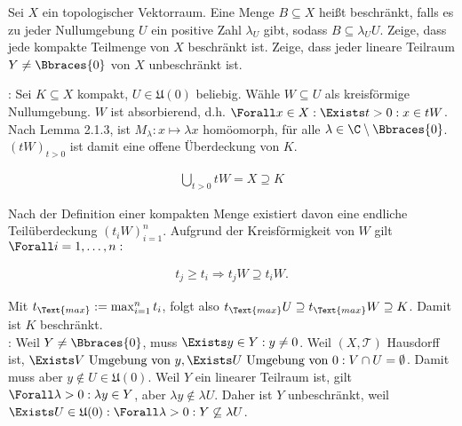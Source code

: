 \begin{exercise}

Sei $X$ ein topologischer Vektorraum.
Eine Menge $B \subseteq X$ heißt beschränkt, falls es zu jeder Nullumgebung $U$ ein positive Zahl $\lambda_U$ gibt, sodass $B \subseteq \lambda_U U$.
Zeige, dass jede kompakte Teilmenge von $X$ beschränkt ist. Zeige, dass jeder lineare Teilraum $Y \neq \Bbraces{0}$ von $X$ unbeschränkt ist.

\end{exercise}

\begin{solution}

:
Sei $K \subseteq X$ kompakt, $U \in \mathfrak{U}(0)$ beliebig.
Wähle $W \subseteq U$ als kreisförmige Nullumgebung.
$W$ ist absorbierend, d.h. $\Forall x \in X: \Exists t > 0: x \in tW$.
Nach Lemma 2.1.3, ist $M_\lambda: x \mapsto \lambda x$ homöomorph, für alle $ \lambda \in \C \setminus \Bbraces{0}$.
$(tW)_{t > 0}$ ist damit eine offene Überdeckung von $K$.

\begin{align*}
  \bigcup_{t > 0} tW = X \supseteq K
\end{align*}

Nach der Definition einer kompakten Menge existiert davon eine endliche Teilüberdeckung $(t_i W)_{i=1}^n$.
Aufgrund der Kreisförmigkeit von $W$ gilt $\Forall i = 1, \ldots, n:$

\begin{align*}
  t_j \geq t_i
  \Rightarrow
  t_j W \supseteq t_i W.
\end{align*}

Mit $t_\Text{max} := \max_{i=1}^n t_i$, folgt also $t_\Text{max} U \supseteq t_\Text{max} W \supseteq K$.
Damit ist $K$ beschränkt. \\

:
Weil $Y \neq \Bbraces{0}$, muss $\Exists y \in Y: y \neq 0$. Weil $(X, \mathcal{T})$ Hausdorff ist, $\Exists V \text{ Umgebung von } y, \Exists U \text{ Umgebung von } 0: V \cap U = \emptyset$.
Damit muss aber $y \notin U \in \mathfrak{U}(0)$.
Weil $Y$ ein linearer Teilraum ist, gilt $\Forall \lambda > 0: \lambda y \in Y$, aber $\lambda y \notin \lambda U$.
Daher ist $Y$ unbeschränkt, weil $\Exists U \in \mathfrak{U}(0): \Forall \lambda > 0: Y \not \subseteq \lambda U$.

\end{solution}
